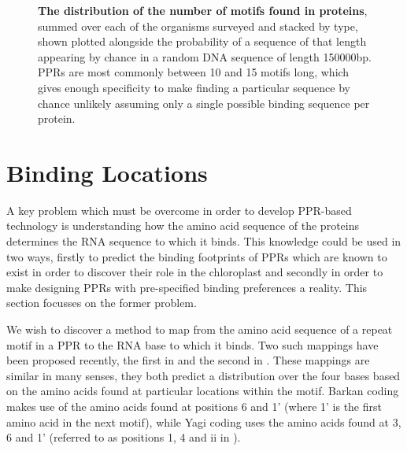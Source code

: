 \begin{figure}
\begin{center}
    \caption{
      \textbf{The distribution of the number of motifs found in proteins}, 
      summed over each of the organisms surveyed and stacked by type, shown
      plotted alongside the probability of a sequence of that length appearing
      by chance in a random DNA sequence of length 150000bp.
      PPRs are most commonly between 10 and 15 motifs long, which gives enough
      specificity to make finding a particular sequence by chance unlikely
      assuming only a single possible binding sequence per protein.
      \label{fig:ppr_family_lengths}}
  \end{center}
\end{figure}

\section{Binding Locations}

A key problem which must be overcome in order to develop PPR-based technology
is understanding how the amino acid sequence of the proteins determines the RNA
sequence to which it binds.
This knowledge could be used in two ways, firstly to predict the binding
footprints of PPRs which are known to exist in order to discover their role in
the chloroplast and secondly in order to make designing PPRs with pre-specified
binding preferences a reality.
This section focusses on the former problem.

We wish to discover a method to map from the amino acid sequence of a repeat
motif in a PPR to the RNA base to which it binds.
Two such mappings have been proposed recently, the first in \citet{Barkan2012}
and the second in \citet{Yagi2013}.
These mappings are similar in many senses, they both predict a distribution
over the four bases based on the amino acids found at particular locations
within the motif.
Barkan coding makes use of the amino acids found at positions 6 and 1' (where
1' is the first amino acid in the next motif), while Yagi coding uses the amino
acids found at 3, 6 and 1' (referred to as positions 1, 4 and ii in 
\citet{Yagi2013}).

